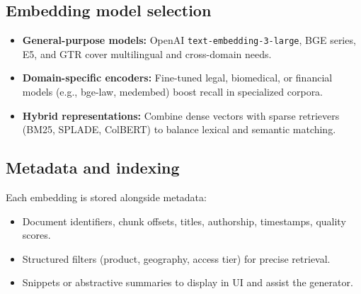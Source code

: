 \documentclass{article}
\begin{document}
\subsection{Embedding model selection}
\begin{itemize}
  \item \textbf{General-purpose models:} OpenAI \texttt{text-embedding-3-large}, BGE series, E5, and GTR cover multilingual and cross-domain needs.
  \item \textbf{Domain-specific encoders:} Fine-tuned legal, biomedical, or financial models (e.g., bge-law, medembed) boost recall in specialized corpora.
  \item \textbf{Hybrid representations:} Combine dense vectors with sparse retrievers (BM25, SPLADE, ColBERT) to balance lexical and semantic matching.
\end{itemize}

\subsection{Metadata and indexing}
Each embedding is stored alongside metadata:
\begin{itemize}
  \item Document identifiers, chunk offsets, titles, authorship, timestamps, quality scores.
  \item Structured filters (product, geography, access tier) for precise retrieval.
  \item Snippets or abstractive summaries to display in UI and assist the generator.
\end{itemize}
\end{document}
